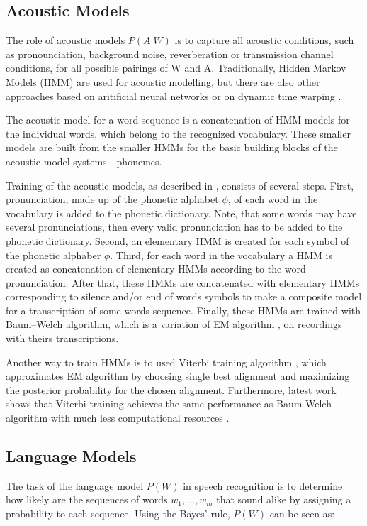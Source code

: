 \subsection{Acoustic Models}
The role of acoustic models $P(A|W)$ is to capture all acoustic conditions,
  such as pronounciation, background noise, reverberation or transmission channel conditions,
  for all possible pairings of W and A.
Traditionally, Hidden Markov Models (HMM) are used for acoustic modelling,
  but there are also other approaches based on aritificial neural networks \cite{lippmann1989review} or on dynamic time warping \cite{rabiner1981isolated}.

The acoustic model for a word sequence is a concatenation of HMM models for the individual words,
  which belong to the recognized vocabulary.
These smaller models are built from the smaller HMMs for the basic building blocks of the acoustic model systems - phonemes.

Training of the acoustic models, as described in \cite{frederick1997statistical}, consists of several steps.
First, pronunciation, made up of the phonetic alphabet $\phi$, of each word in the vocabulary is added to the phonetic dictionary.
Note, that some words may have several pronunciations,
  then every valid pronunciation has to be added to the phonetic dictionary.
Second, an elementary HMM is created for each symbol of the phonetic alphaber $\phi$.
Third, for each word in the vocabulary a HMM is created as concatenation of elementary HMMs according to the word pronunciation.
After that, these HMMs are concatenated with elementary HMMs corresponding to silence and/or end of words symbols to make a composite model for a transcription of some words sequence.
Finally, these HMMs are trained with Baum--Welch \cite{welch2003hidden} algorithm,
  which is a variation of EM algorithm \cite{dempster1977maximum},
  on recordings with theirs transcriptions.

Another way to train HMMs is to used Viterbi training algorithm \cite{franzini1990connectionist},
  which approximates EM algorithm by choosing single best alignment and maximizing the posterior probability for the chosen alignment.
Furthermore, latest work shows that Viterbi training achieves the same performance as Baum-Welch algorithm with much less computational resources \cite{rodriguez2003comparative}.

\subsection{Language Models}
The task of the language model $P(W)$ in speech recognition is
  to determine how likely are the sequences of words $w_1,\dots,w_m$ that sound alike
  by assigning a probability to each sequence.
Using the Bayes' rule, $P(W)$ can be seen as:

